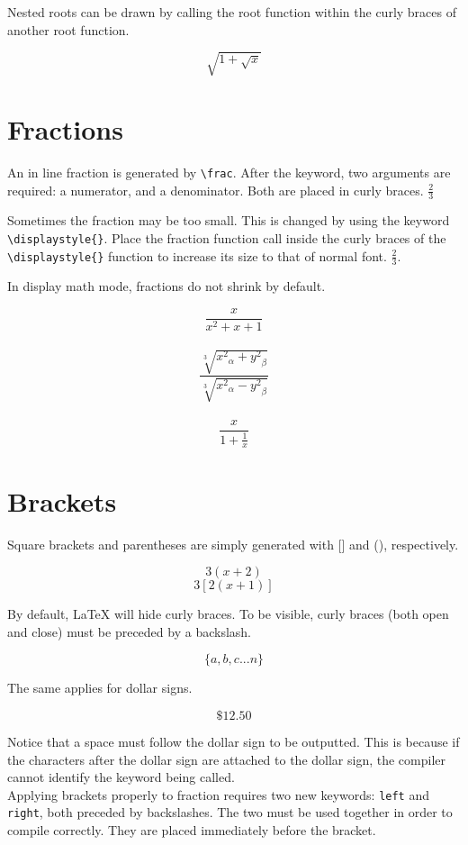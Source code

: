 \documentclass[11pt]{article}
\begin{document}
Nested roots can be drawn by calling the root function within the curly braces of another root function.

$$\sqrt{1+\sqrt{x}}$$

\section{Fractions}

An in line fraction is generated by \texttt{\textbackslash frac}. After the keyword, two arguments are required: a numerator, and a denominator. Both are placed in curly braces. $\frac{2}{3}$ 

Sometimes the fraction may be too small. This is changed by using the keyword \texttt{\textbackslash displaystyle\{\}}. Place the fraction function call inside the curly braces of the \texttt{\textbackslash displaystyle\{\}} function to increase its size to that of normal font. $\displaystyle{\frac{2}{3}}$.

In display math mode, fractions do not shrink by default.

$$\frac{x}{x^2+x+1}$$ \\
$$\frac{\sqrt[3]{{x^2}_\alpha + {y^2}_\beta}}{\sqrt[3]{{x^2}_\alpha - {y^2}_\beta}}$$ \\
$$\frac{x}{1+\frac{1}{x}}$$

\section{Brackets}

Square brackets and parentheses are simply generated with [] and (), respectively. 

$$3(x+2)$$
$$3[2(x+1)]$$

By default, LaTeX will hide curly braces. To be visible, curly braces (both open and close) must be preceded by a backslash. 

$$\{a,b,c ... n\}$$

The same applies for dollar signs. 

$$\$ 12.50$$

Notice that a space must follow the dollar sign to be outputted. This is because if the characters after the dollar sign are attached to the dollar sign, the compiler cannot identify the keyword being called. \\

Applying brackets properly to fraction requires two new keywords:
\texttt{left} and \texttt{right}, both preceded by backslashes. The two must be used together in order to compile correctly. They are placed immediately before the bracket. \\
\end{document}
